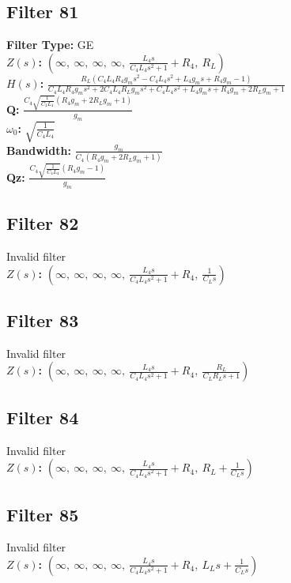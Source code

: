 \documentclass{article}
\begin{document}
\subsection*{Filter 81}
\textbf{Filter Type:} GE \\ 
\textbf{$Z(s)$:} $\left( \infty, \  \infty, \  \infty, \  \infty, \  \frac{L_{4} s}{C_{4} L_{4} s^{2} + 1} + R_{4}, \  R_{L}\right)$ \\ 
\textbf{$H(s)$:} $\frac{R_{L} \left(C_{4} L_{4} R_{4} g_{m} s^{2} - C_{4} L_{4} s^{2} + L_{4} g_{m} s + R_{4} g_{m} - 1\right)}{C_{4} L_{4} R_{4} g_{m} s^{2} + 2 C_{4} L_{4} R_{L} g_{m} s^{2} + C_{4} L_{4} s^{2} + L_{4} g_{m} s + R_{4} g_{m} + 2 R_{L} g_{m} + 1}$ \\ 
\textbf{Q:} $\frac{C_{4} \sqrt{\frac{1}{C_{4} L_{4}}} \left(R_{4} g_{m} + 2 R_{L} g_{m} + 1\right)}{g_{m}}$ \\ 
\textbf{$\omega_0$:} $\sqrt{\frac{1}{C_{4} L_{4}}}$ \\ 
\textbf{Bandwidth:} $\frac{g_{m}}{C_{4} \left(R_{4} g_{m} + 2 R_{L} g_{m} + 1\right)}$ \\ 
\textbf{Qz:} $\frac{C_{4} \sqrt{\frac{1}{C_{4} L_{4}}} \left(R_{4} g_{m} - 1\right)}{g_{m}}$ \\ 
\subsection*{Filter 82}
Invalid filter \\ 
\textbf{$Z(s)$:} $\left( \infty, \  \infty, \  \infty, \  \infty, \  \frac{L_{4} s}{C_{4} L_{4} s^{2} + 1} + R_{4}, \  \frac{1}{C_{L} s}\right)$ \\ 
\subsection*{Filter 83}
Invalid filter \\ 
\textbf{$Z(s)$:} $\left( \infty, \  \infty, \  \infty, \  \infty, \  \frac{L_{4} s}{C_{4} L_{4} s^{2} + 1} + R_{4}, \  \frac{R_{L}}{C_{L} R_{L} s + 1}\right)$ \\ 
\subsection*{Filter 84}
Invalid filter \\ 
\textbf{$Z(s)$:} $\left( \infty, \  \infty, \  \infty, \  \infty, \  \frac{L_{4} s}{C_{4} L_{4} s^{2} + 1} + R_{4}, \  R_{L} + \frac{1}{C_{L} s}\right)$ \\ 
\subsection*{Filter 85}
Invalid filter \\ 
\textbf{$Z(s)$:} $\left( \infty, \  \infty, \  \infty, \  \infty, \  \frac{L_{4} s}{C_{4} L_{4} s^{2} + 1} + R_{4}, \  L_{L} s + \frac{1}{C_{L} s}\right)$ \\ 
\end{document}
